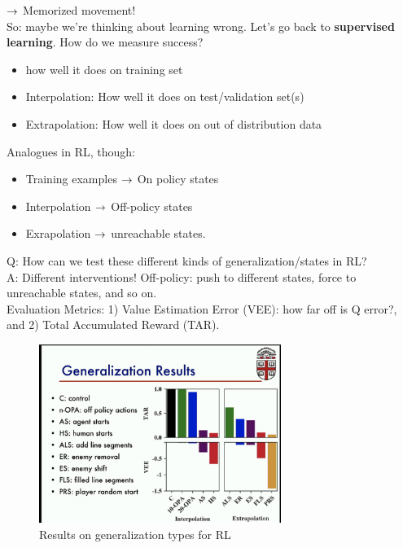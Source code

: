 $\rightarrow$ Memorized movement! \\

So: maybe we're thinking about learning wrong. Let's go back to {\bf supervised learning}. How do we measure success?
\begin{itemize}
    \item how well it does on training set
    \item Interpolation: How well it does on test/validation set(s)
    \item Extrapolation: How well it does on out of distribution data
\end{itemize}

Analogues in RL, though:
\begin{itemize}
    \item Training examples $\rightarrow$ On policy states
    \item Interpolation $\rightarrow$ Off-policy states
    \item Exrapolation $\rightarrow$ unreachable states.
\end{itemize}

Q: How can we test these different kinds of generalization/states in RL? \\

A: Different interventions! Off-policy: push to different states, force to unreachable states, and so on. \\

Evaluation Metrics: 1) Value Estimation Error (VEE): how far off is Q error?, and 2) Total Accumulated Reward (TAR). \\

\begin{figure}[h!]
    \centering
    \includegraphics[width=0.7\textwidth]{figures/gen.png}
    \caption{Results on generalization types for RL}
    \label{fig:gen}
\end{figure}

